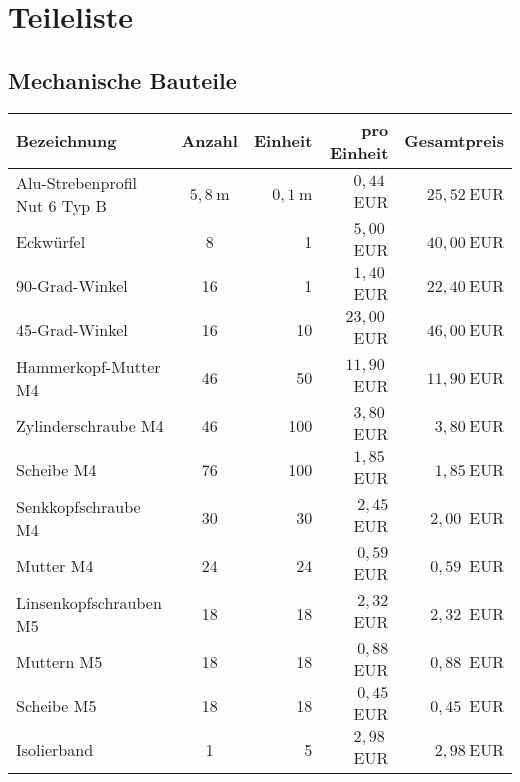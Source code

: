 \documentclass[./00PhotoBox.tex]{subfiles}
\begin{document}
\chapter{Teileliste}
\label{ch:teileliste}
\section{Mechanische Bauteile}


\begin{table}[ht]
    \centering
    \begin{tabular}{l|c|r|r|r}
        Bezeichnung                   & Anzahl  & Einheit & pro Einheit & Gesamtpreis           \\
        \hline
        Alu-Strebenprofil Nut 6 Typ B & $5,8~$m & $0,1~$m & $0,44~$EUR  & $25,52~$EUR           \\
        Eckwürfel                     & 8       & 1       & $5,00~$EUR  & $40,00~$EUR           \\
        90-Grad-Winkel                & 16      & 1       & $1,40~$EUR  & $22,40~$EUR           \\
        45-Grad-Winkel                & 16      & 10      & $23,00~$EUR & $46,00~$EUR           \\
        Hammerkopf-Mutter M4          & 46      & 50      & $11,90~$EUR & $11,90~$EUR           \\
        Zylinderschraube M4           & 46      & 100     & $3,80~$EUR  & $3,80~$EUR            \\
        Scheibe M4                    & 76      & 100     & $1,85~$EUR  & $1,85~$EUR            \\
        Senkkopfschraube M4           & 30      & 30      & $2,45$~EUR  & $2,00$~EUR            \\
        Mutter M4                     & 24      & 24      & $0,59$~EUR  & $0,59$~EUR            \\
        Linsenkopfschrauben M5        & 18      & 18      & $2,32$~EUR  & $2,32$~EUR            \\ %
        Muttern M5                    & 18      & 18      & $0,88$~EUR  & $0,88$~EUR            \\
        Scheibe M5                    & 18      & 18      & $0,45$~EUR  & $0,45$~EUR            \\
        Isolierband                   & 1       & 5       & $2,98~$EUR  & $2,98~$EUR            \\

\end{tabular}
\end{table}
\end{document}
